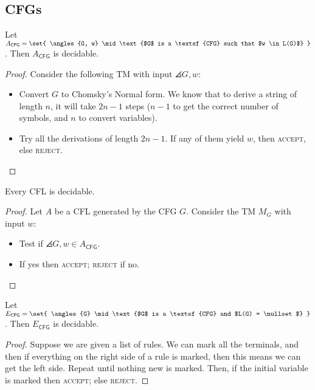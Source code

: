 \documentclass{standalone}
\begin{document}
\subsection{CFGs}
\begin{proposition}
	Let \(A_{\textsf{CFG}} = \set{
		\angles{G, w} \mid \text{$G$ is a \textsf{CFG} such that $w \in L(G)$}
	}\). Then \(A_{\textsf{CFG}}\) is decidable.
\end{proposition}
\begin{proof}
	Consider the following \textsf{TM} with input \(\angles{G, w}\):
	\begin{itemize}
		\item Convert \(G\) to Chomsky's Normal form.
          We know that to derive a string of length $n$,
          it will take \(2n - 1\) steps
          (\(n - 1\) to get the correct number of symbols,
          and \(n\) to convert variables).
		\item Try all the derivations of length \(2n - 1\).
          If any of them yield \(w\), then \textsc{accept},
          else \textsc{reject}. \qedhere
	\end{itemize}
\end{proof}

\begin{proposition}
	Every \textsf{CFL} is decidable.
\end{proposition}
\begin{proof}
	Let \(A\) be a \textsf{CFL} generated by the \textsf{CFG} \(G\).
  Consider the \textsf{TM} \(M_G\) with input \(w\):
	\begin{itemize}
		\item Test if \(\angles{G, w} \in A_{\textsf{CFG}}\).
		\item If yes then \textsc{accept}; \textsc{reject} if no. \qedhere
	\end{itemize}
\end{proof}

\begin{proposition}
	Let \(E_{\textsf{CFG}} = \set{
		\angles{G} \mid \text{$G$ is a \textsf{CFG} and $L(G) = \nullset$}
	}\). Then \(E_{\textsf{CFG}}\) is decidable.
\end{proposition}
\begin{proof}
	Suppose we are given a list of rules.
  We can mark all the terminals,
  and then if everything on the right side of a rule is marked,
  then this means we can get the left side.
  Repeat until nothing new is marked.
  Then, if the initial variable is marked then \textsc{accept};
  else \textsc{reject}.
\end{proof}
\end{document}
